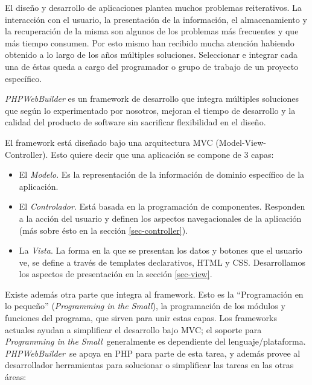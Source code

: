 \documentclass[a4paper,10pt]{article}
\newcommand{\PITS}{\emph{Programming in the Small}} %
\newcommand{\PWB}{\emph{PHPWebBuilder}}
\begin{document}
El diseño y desarrollo de aplicaciones plantea muchos problemas reiterativos. La interacción con el usuario, la presentación de la información, el almacenamiento y la recuperación de la misma son algunos de los problemas más frecuentes y que más tiempo consumen.
Por esto mismo han recibido mucha atención habiendo obtenido a lo largo de los años múltiples soluciones. Seleccionar e integrar cada una de éstas queda a cargo del programador o grupo de trabajo de un proyecto específico.

\PWB \cite{PWB} es un framework de desarrollo que integra múltiples soluciones que según lo experimentado por nosotros, mejoran el tiempo de desarrollo y la calidad del producto de software sin sacrificar flexibilidad en el diseño.

El framework está diseñado bajo una arquitectura MVC (Model-View-Controller)\cite{mvc}.
Esto quiere decir que una aplicación se compone de 3 capas:
\begin{itemize}
\item El \emph{Modelo}. Es la representación de la información de dominio específico de la aplicación.
\item El \emph{Controlador}. Está basada en la programación de componentes. Responden a la acción del usuario y definen los aspectos navegacionales de la aplicación (más sobre ésto en la sección \ref{sec-controller}).
\item La \emph{Vista}. La forma en la que se presentan los datos y botones que el usuario ve, se define a través de templates declarativos, HTML y CSS. Desarrollamos los aspectos de presentación en la sección \ref{sec-view}.
\end{itemize}

Existe además otra parte que integra al framework. Esto es la ``Programación en lo pequeño'' (\PITS), la programación de los módulos y funciones del programa, que sirven para unir estas capas. Los frameworks actuales ayudan a simplificar el desarrollo bajo MVC; el soporte para \PITS \ generalmente es dependiente del lenguaje/plataforma. \PWB \ se apoya en PHP para parte de esta tarea, y además provee al desarrollador herramientas para solucionar o simplificar las tareas en las otras áreas:
\end{document}
